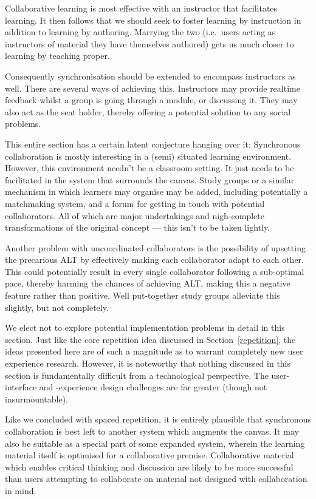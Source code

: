 Collaborative learning is most effective with an instructor that facilitates 
learning\cite{gokhale1995collaborative}. It then follows that we should seek 
to foster learning by instruction in addition to learning by authoring. 
Marrying the two (i.e.\ users acting as instructors of material they have 
themselves authored) gets us much closer to learning by teaching proper.

Consequently synchronisation should be extended to encompass instructors as 
well. There are several ways of achieving this. Instructors may provide 
realtime feedback whilst a group is going through a module, or discussing it. 
They may also act as the seat holder, thereby offering a potential solution to 
any social problems.

This entire section has a certain latent conjecture hanging over it: 
Synchronous collaboration is mostly interesting in a (semi) situated learning 
environment. However, this environment needn't be a classroom setting. It just
needs to be facilitated in the system that surrounds the canvas. Study groups 
or a similar mechanism in which learners may organise may be added, including 
potentially a matchmaking system, and a forum for getting in touch with 
potential collaborators. All of which are major undertakings and nigh-complete 
transformations of the original concept --- this isn't to be taken lightly.

Another problem with uncoordinated collaborators is the possibility of 
upsetting the precarious ALT by effectively making each collaborator adapt to 
each other. This could potentially result in every single collaborator 
following a sub-optimal pace, thereby harming the chances of achieving ALT, 
making this a negative feature rather than positive. Well put-together study 
groups alleviate this slightly, but not completely.

We elect not to explore potential implementation problems in detail in this 
section. Just like the core repetition idea discussed in 
Section~\ref{repetition}, the ideas presented here are of such a magnitude as 
to warrant completely new user experience research. However, it is noteworthy 
that nothing discussed in this section is fundamentally difficult from a 
technological perspective. The user-interface and -experience design 
challenges are far greater (though not insurmountable).

Like we concluded with spaced repetition, it is entirely plausible that 
synchronous collaboration is best left to another system which augments the 
canvas. It may also be suitable as a special part of some expanded system, 
wherein the learning material itself is optimised for a collaborative premise. 
Collaborative material which enables critical thinking and discussion are 
likely to be more successful than users attempting to collaborate on material 
not designed with collaboration in mind.

